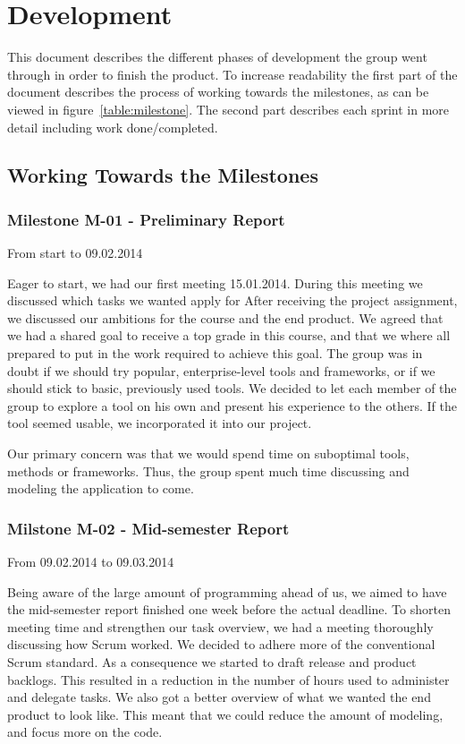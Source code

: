 \chapter{Development}\label{chapter:development}

This document describes the different phases of development the group
went through in order to finish the product. To increase readability
the first part of the document describes the process of working towards the
milestones, as can be viewed in figure~\ref{table:milestone}. The second part
describes each sprint in more detail including work done/completed. 

\section{Working Towards the Milestones}
\subsection{Milestone M-01 - Preliminary Report}
\label{sec:M01}

From start to 09.02.2014

Eager to start, we had our first meeting 15.01.2014. During this meeting we
discussed which tasks we wanted apply for After receiving the project
assignment, we discussed our ambitions for the course and the end product. We
agreed that we had a shared goal to receive a top grade in this course, and
that we where all prepared to put in the work required to achieve this goal.
The group was in doubt if we should try popular, enterprise-level tools and
frameworks, or if we should stick to basic, previously used tools. We decided
to let each member of the group to explore a tool on his own and present his
experience to the others. If the tool seemed usable, we incorporated it into
our project.

Our primary concern was that we would spend time on suboptimal tools, methods
or frameworks. Thus, the group spent much time discussing and modeling the
application to come. 

\pagebreak
\subsection{Milstone M-02 - Mid-semester Report}
\label{sec:M02}
From 09.02.2014 to 09.03.2014

Being aware of the large amount of programming ahead of us, we aimed to have
the mid-semester report finished one week before the actual deadline. To
shorten meeting time and strengthen our task overview, we had a meeting
thoroughly discussing how Scrum worked. We decided to adhere more of the
conventional Scrum standard. As a consequence we started to draft release and
product backlogs. This resulted in a reduction in the number of hours used to
administer and delegate tasks. We also got a better overview of what we wanted
the end product to look like. This meant that we could reduce the amount of
modeling, and focus more on the code. 

